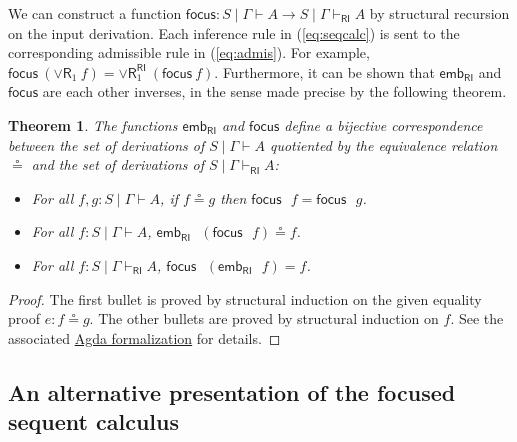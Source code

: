 \documentclass[submission,copyright,creativecommons]{eptcs}
\newtheorem{theorem}{Theorem}[section]
\theoremstyle{definition}
\newcommand{\orrone}{\lor \mathsf{R}_{1}}
\newcommand{\RI}{\mathsf{RI}}
\begin{document}
We can construct a function $\mathsf{focus} : S \mid \Gamma \vdash A \to S \mid \Gamma \vdash_{\RI} A$ by structural recursion on the input derivation. Each inference rule in (\ref{eq:seqcalc}) is sent to the corresponding admissible rule in (\ref{eq:admis}).
For example, $\mathsf{focus} \ (\orrone \ f) = \orrone^{\RI} \ (\mathsf{focus} \ f)$. Furthermore, it can be shown that $\mathsf{emb}_{\RI}$ and $\mathsf{focus}$ are each other inverses, in the sense made precise by the following theorem.
\begin{theorem}\label{thm:corr}
  The functions $\mathsf{emb}_{\RI}$ and $\mathsf{focus}$ define a bijective correspondence between the set of derivations of $S \mid \Gamma \vdash A$ quotiented by the equivalence relation $\circeq$ and the set of derivations of $S \mid \Gamma \vdash_{\RI} A$: 
  \begin{itemize}
    \item For all $f, g : S \mid \Gamma \vdash A$, if $f \circeq g$ then $\mathsf{focus} \text{ } f = \mathsf{focus} \text{ } g$.
    \item For all $f : S \mid \Gamma \vdash A$, $\mathsf{emb}_{\RI} \text{ } (\mathsf{focus} \text{ } f) \circeq f$.
    \item For all $f : S \mid \Gamma \vdash_{\RI} A$, $\mathsf{focus} \text{ } (\mathsf{emb}_{\RI} \text{ } f) = f$.
  \end{itemize}
\end{theorem}
\begin{proof}
  The first bullet is proved by structural induction on the given equality proof $e : f \circeq g$. The other bullets are proved by structural induction on $f$. See the associated \href{https://github.com/cswphilo/SkewMonAdd/blob/main/skew-mon-conjunction-disjunction/Main.agda}{Agda formalization} for details.
\end{proof}

\subsection{An alternative presentation of the focused sequent calculus}\label{subsec:foc:alt}
\end{document}
